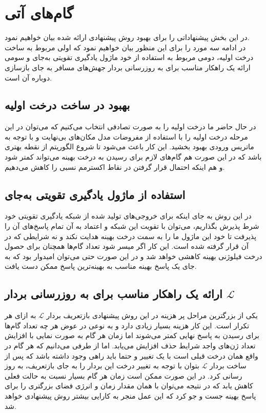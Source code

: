   
\section{گام‌های آتی}
در این بخش پیشنهاداتی را برای بهبود روش پیشنهادی ارائه شده بیان خواهیم نمود.\\
در ادامه سه مورد را برای این منظور بیان خواهیم نمود که اولی مربوط به ساخت درخت اولیه، دومی مربوط به استفاده از خود ماژول یادگیری تقویتی به‌جای  و سومی ارائه یک راهکار مناسب برای به روزرسانی بردار جهش‌های مسافر به جای بازسازی دوباره آن است.


\subsection{بهبود در ساخت درخت اولیه}
در حال حاضر ما درخت اولیه را به صورت تصادفی انتخاب می‌کنیم که می‌توان در این مرحله درخت اولیه را با استفاده از مفروضات مدل مکان‌های بی‌نهایت و با توجه به ماتریس ورودی بهبود بخشید. این کار باعث می‌شود تا شروع الگوریتم از نقطه بهتری باشد که در این صورت هم گام‌های لازم برای رسیدن به درخت بهینه می‌تواند کمتر شود و هم اینکه احتمال قرار گرفتن در نقاط اکسترمم نسبی را کاهش می‌دهیم.


\subsection{استفاده از ماژول یادگیری تقویتی به‌جای  }
در این روش به جای اینکه برای خروجی‌های تولید شده از شبکه یادگیری تقویتی خود شرط پذیرش بگذاریم، می‌توان با تقویت این شبکه و اعتماد به آن تمام پاسخ‌های آن را پذیرفت تا خود این ماژول ما را به سمت درخت بهینه هدایت نکند و نه شرایطی که در آن قرار گرفته شده است. این کار اگر میسر شود تعداد گام‌ها همچنان برای حصول درخت فیلوژنی بهینه کاهشی خواهد شد و در این صورت حتی می‌توان امیدوار بود که به جای یک پاسخ بهینه مناسب به بهینه‌ترین پاسخ ممکن دست یافت.

\subsection{ ارائه یک راهکار مناسب برای به روزرسانی بردار $\mathcal{L}$}
یکی از بزرگترین مراحل پر هزینه در این روش پیشنهادی بازتعریف بردار $\mathcal{L}$ به ازای هر تکرار است. این کار هزینه بسیار زیادی دارد و به نوعی در عوض هر چه تعداد گام‌ها برای رسیدن به پاسخ نهایی کمتر می‌شوند اما زمان هر گام به صورت نمایی با افزایش تعداد ژن‌های واجد شرایط حذف افزایش می‌یابد. اما از طرفی می‌دانیم که هر گام در واقع همان درخت قبلی است با یک تغییر و حتما باید راهی وجود داشته باشد که پس از ساخت بردار $\mathcal{L}$ بتوان با توجه به تغییر درخت این بردار را به جای بازتعریف، به روز رسانی کرد. در این صورت ممکن است زمان هر گام بسیار نسبت به حالت فعلی کاهش یابد که در نتیجه می‌توان با همان مقدار زمان و انرژی فضای بزرگتری را برای پاسخ بهینه جست و جو کرد که این عمل منجر به کارایی بیشتر روش پیشنهادی خواهد شد.

